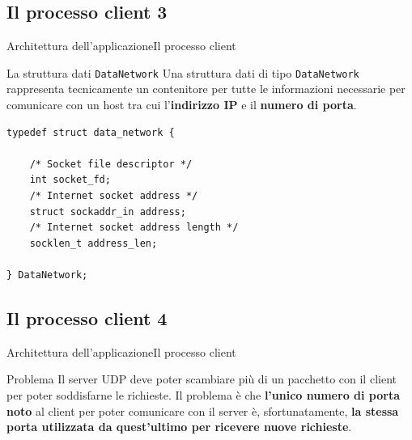\documentclass[10pt]{beamer}
\begin{document}
\subsection{Il processo client 3}
\begin{frame}[fragile]{Architettura dell'applicazione}{Il processo client}

\begin{block}{La struttura dati \texttt{DataNetwork}}
Una struttura dati di tipo \texttt{DataNetwork} rappresenta tecnicamente un contenitore per tutte le informazioni necessarie per comunicare con un host tra cui l'\textbf{indirizzo IP} e il \textbf{numero di porta}. 
\end{block}

\begin{lstlisting}[frame=lines, caption={Implementazione della struttura \texttt{DataNetwork}}]
typedef struct data_network {

	/* Socket file descriptor */
	int socket_fd;
	/* Internet socket address */
	struct sockaddr_in address;
	/* Internet socket address length */
	socklen_t address_len;

} DataNetwork;

\end{lstlisting}
\end{frame}

\subsection{Il processo client 4}
\begin{frame}[fragile]{Architettura dell'applicazione}{Il processo client}

\begin{block}{Problema}
Il server UDP deve poter scambiare più di un pacchetto con il client per poter soddisfarne le richieste. Il problema è che \textbf{l'unico numero di porta noto} al client per poter comunicare con il server è, sfortunatamente, \textbf{la stessa porta utilizzata da quest'ultimo per ricevere nuove richieste}.
\end{block}

\end{frame}
\end{document}
